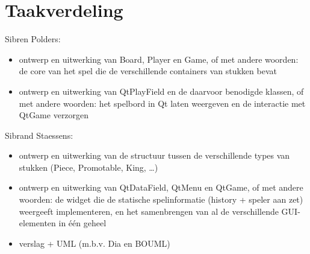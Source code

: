 \documentclass[a4paper,11pt,oneside, titlepage]{article}
\begin{document}
\section{Taakverdeling}
Sibren Polders:
	\begin{itemize}
		\item ontwerp en uitwerking van Board, Player en Game, of met andere woorden: de core van het spel die de verschillende containers van stukken bevat
		\item ontwerp en uitwerking van QtPlayField en de daarvoor benodigde klassen, of met andere woorden: het spelbord in Qt laten weergeven en de interactie met QtGame verzorgen
	 \end{itemize} 
Sibrand Staessens:
	\begin{itemize}
		\item ontwerp en uitwerking van de structuur tussen de verschillende types van stukken (Piece, Promotable, King, \ldots)
		\item ontwerp en uitwerking van QtDataField, QtMenu en QtGame, of met andere woorden: de widget die de statische spelinformatie (history + speler aan zet) weergeeft implementeren, en het samenbrengen van al de verschillende GUI-elementen in \'e\'en geheel
		\item verslag + UML (m.b.v. Dia en BOUML)
	 \end{itemize} 
\end{document}
